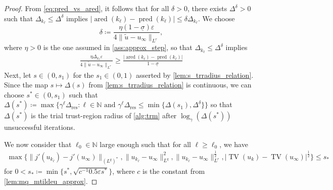 \documentclass[11pt]{article}
\newcommand{\N}{\mathbb{N}}
\DeclareMathOperator*{\TV}{TV}
\DeclareMathOperator*{\pred}{pred}
\DeclareMathOperator*{\ared}{ared}
\theoremstyle{definition}
\theoremstyle{remark}
\begin{document}
\begin{proof}
From \eqref{eq:pred_vs_ared}, it follows
that for all $\delta > 0$, there exists $\Delta^\delta > 0$ such that $\Delta_{k_\ell} \le \Delta^\delta$ implies $|\ared(k_\ell) - \pred(k_\ell)| \le \delta \Delta_{k_\ell}$. We choose
%
\[ \delta
\coloneqq 
\frac{\eta (1 - \underline{\sigma})\varepsilon}{4\|\tilde{u} - u_\infty\|_{L^r}},
\]
%
where $\eta > 0$ is the one assumed in 
\cref{ass:approx_step}, so that
$\Delta_{k_\ell} \le \Delta^\delta$
implies
%
\begin{gather}\label{eq:pred_lb_first_estimate} 
\frac{\eta\Delta_{k_\ell}\varepsilon}{4\|\tilde{u} - u_\infty\|_{L^r}}
\ge \frac{|\ared(k_\ell) - \pred(k_\ell)|}{1 - \underline{\sigma}}
\end{gather}
%
Next, let $s \in (0,s_1)$ for the $s_1 \in (0,1)$ asserted by \cref{lem:s_trradius_relation}. Since the map $s \mapsto \Delta(s)$ from \cref{lem:s_trradius_relation}
is continuous, we can choose $s^* \in (0,s_1)$ such that $\Delta(s^*) \coloneqq \max \big\{ \gamma^\ell \Delta_{\text{res}} : \ell \in \N \text{ and } \gamma^\ell \Delta_{\text{res}} \le \min\{\Delta(s_1),\Delta^\delta\}\big\}$
so that $\Delta(s^*)$ is the trial trust-region radius
of \cref{alg:trm} after $\log_{\gamma}(\Delta(s^*))$
unsuccessful iterations.

We now consider that $\ell_0 \in \N$ large enough such
that for all $\ell \ge \ell_0$, we have
%
\begin{gather}\label{eq:ukl_uinfty_close}
\max\big\{\|j'(u_{k_\ell}) - j'(u_{\infty})\|_{(L^q)^*},
\|u_{k_\ell} - u_\infty\|_{L^q}^2,
\|u_{k_\ell} - u_\infty\|_{L^r}^{\frac{1}{2}},
|\TV(u_k) - \TV(u_\infty)|^{\frac{1}{2}}\big\}
\le s_*
\end{gather}
%
for $0 < s_* \coloneqq \min\{s^*, \sqrt{c^{-1} 0.5 \varepsilon s^*}\}$, 
where $c$ is the constant from \cref{lem:mq_mtildeu_approx}.



\end{proof}
\end{document}
